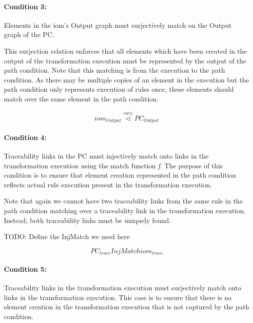 \paragraph{Condition 3:}

Elements in the iom's Output graph must surjectively match on the Output graph of the PC.

This surjection relation enforces that all elements which have been created in the output of the transformation execution must be represented by the output of the path condition. Note that this matching is from the execution to the path condition. As there may be multiple copies of an element in the execution but the path condition only represents execution of rules once, these elements should match over the same element in the path condition.

\begin{equation}
\label{eq:abstr_apply_surjective_match}
\mathit{iom}_{Output} \stackrel{surj}{\vartriangleleft} \mathit{PC}_{Output}
\end{equation} 

\paragraph{Condition 4:}

Traceability links in the PC must injectively match onto links in the transformation execution using the match function \textit{f}. The purpose of this condition is to ensure that element creation represented in the path condition reflects actual rule execution present in the transformation execution.

Note that again we cannot have two traceability links from the same rule in the path condition matching over a traceability link in the transformation execution. Instead, both traceability links must be uniquely found.

TODO: Define the InjMatch we need here

\begin{equation}
\label{eq:abstr_links_injective}
\mathit{PC}_{trace} InjMatch \mathit{iom}_{trace}
\end{equation} 

\paragraph{Condition 5:}

Traceability links in the transformation execution must surjectively match onto links in the transformation execution. This case is to ensure that there is no element creation in the transformation execution that is not captured by the path condition.

